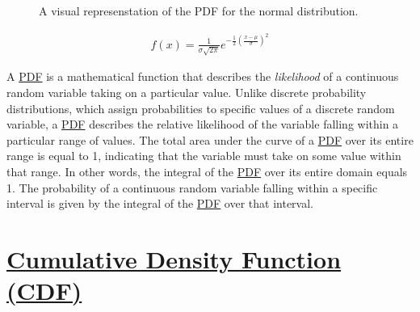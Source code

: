 \documentclass[
  a4paper,
]{scrbook}
\begin{document}
\begin{figure}[ht]


\caption{\label{fig-pdf-000-scr}A visual represenstation of the PDF for
the normal distribution.}

\end{figure}%

\begin{align}
f(x) = \frac{1}{\sigma\sqrt{2\pi}}e^{-\frac{1}{2}(\frac{x-\mu}{\sigma})^2}
\end{align}

A \hyperref[acronyms_PDF]{PDF} is a mathematical function that describes
the \emph{likelihood} of a continuous random variable taking on a
particular value. Unlike discrete probability distributions, which
assign probabilities to specific values of a discrete random variable, a
\hyperref[acronyms_PDF]{PDF} describes the relative likelihood of the
variable falling within a particular range of values. The total area
under the curve of a \hyperref[acronyms_PDF]{PDF} over its entire range
is equal to 1, indicating that the variable must take on some value
within that range. In other words, the integral of the
\hyperref[acronyms_PDF]{PDF} over its entire domain equals 1. The
probability of a continuous random variable falling within a specific
interval is given by the integral of the \hyperref[acronyms_PDF]{PDF}
over that interval.

\section{\texorpdfstring{\hyperref[acronyms_CDF]{Cumulative Density
Function (CDF)}}{Cumulative Density Function (CDF)}}\label{section-4}
\end{document}

